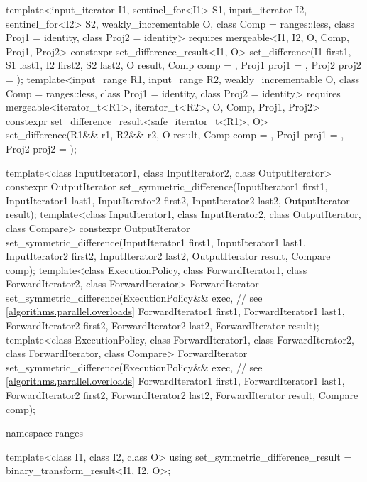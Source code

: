 \begin{codeblock}
{{    template<input_iterator I1, sentinel_for<I1> S1, input_iterator I2, sentinel_for<I2> S2,
             weakly_incrementable O, class Comp = ranges::less,
             class Proj1 = identity, class Proj2 = identity>
      requires mergeable<I1, I2, O, Comp, Proj1, Proj2>
      constexpr set_difference_result<I1, O>
        set_difference(I1 first1, S1 last1, I2 first2, S2 last2, O result,
                       Comp comp = {}, Proj1 proj1 = {}, Proj2 proj2 = {});
    template<input_range R1, input_range R2, weakly_incrementable O,
             class Comp = ranges::less, class Proj1 = identity, class Proj2 = identity>
      requires mergeable<iterator_t<R1>, iterator_t<R2>, O, Comp, Proj1, Proj2>
      constexpr set_difference_result<safe_iterator_t<R1>, O>
        set_difference(R1&& r1, R2&& r2, O result,
                       Comp comp = {}, Proj1 proj1 = {}, Proj2 proj2 = {});
  }

  template<class InputIterator1, class InputIterator2, class OutputIterator>
    constexpr OutputIterator
      set_symmetric_difference(InputIterator1 first1, InputIterator1 last1,
                               InputIterator2 first2, InputIterator2 last2,
                               OutputIterator result);
  template<class InputIterator1, class InputIterator2, class OutputIterator, class Compare>
    constexpr OutputIterator
      set_symmetric_difference(InputIterator1 first1, InputIterator1 last1,
                               InputIterator2 first2, InputIterator2 last2,
                               OutputIterator result, Compare comp);
  template<class ExecutionPolicy, class ForwardIterator1, class ForwardIterator2,
           class ForwardIterator>
    ForwardIterator
      set_symmetric_difference(ExecutionPolicy&& exec,          // see \ref{algorithms.parallel.overloads}
                               ForwardIterator1 first1, ForwardIterator1 last1,
                               ForwardIterator2 first2, ForwardIterator2 last2,
                               ForwardIterator result);
  template<class ExecutionPolicy, class ForwardIterator1, class ForwardIterator2,
           class ForwardIterator, class Compare>
    ForwardIterator
      set_symmetric_difference(ExecutionPolicy&& exec,          // see \ref{algorithms.parallel.overloads}
                               ForwardIterator1 first1, ForwardIterator1 last1,
                               ForwardIterator2 first2, ForwardIterator2 last2,
                               ForwardIterator result, Compare comp);

  namespace ranges {
    template<class I1, class I2, class O>
    using set_symmetric_difference_result = binary_transform_result<I1, I2, O>;

}}
\end{codeblock}
